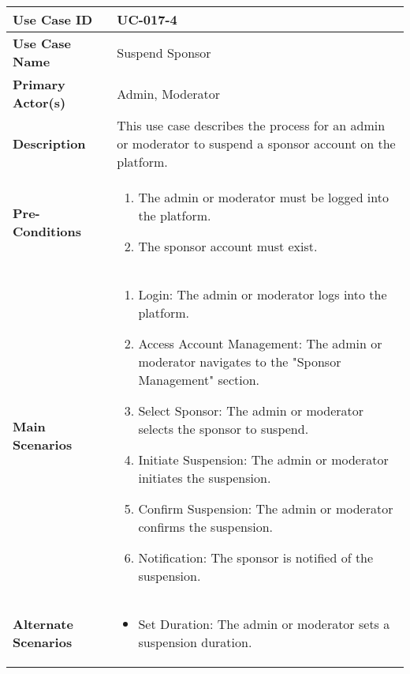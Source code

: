 \begin{table}[!ht]
    \centering
    \renewcommand{\arraystretch}{1.3} %
    \begin{tabularx}{\textwidth}{|l|X|}
        \hline
        \textbf{Use Case ID} & UC-017-4 \\
        \hline
        \textbf{Use Case Name} & Suspend Sponsor \\
        \hline
        \textbf{Primary Actor(s)} & Admin, Moderator \\
        \hline
        \textbf{Description} & This use case describes the process for an admin or moderator to suspend a sponsor account on the platform. \\
        \hline
        \textbf{Pre-Conditions} & 
        \begin{enumerate}[label=\arabic*.,itemsep=0pt]
            \item The admin or moderator must be logged into the platform.
            \item The sponsor account must exist.
        \end{enumerate} \\
        \hline
        \textbf{Main Scenarios} & 
        \begin{enumerate}[label=\arabic*.,itemsep=0pt]
            \item Login: The admin or moderator logs into the platform.
            \item Access Account Management: The admin or moderator navigates to the "Sponsor Management" section.
            \item Select Sponsor: The admin or moderator selects the sponsor to suspend.
            \item Initiate Suspension: The admin or moderator initiates the suspension.
            \item Confirm Suspension: The admin or moderator confirms the suspension.
            \item Notification: The sponsor is notified of the suspension.
        \end{enumerate} \\
        \hline
        \textbf{Alternate Scenarios} & 
        \begin{itemize}[label=--,itemsep=0pt]
            \item Set Duration: The admin or moderator sets a suspension duration.
        \end{itemize} \\
        \hline

\end{tabularx}
\end{table}
